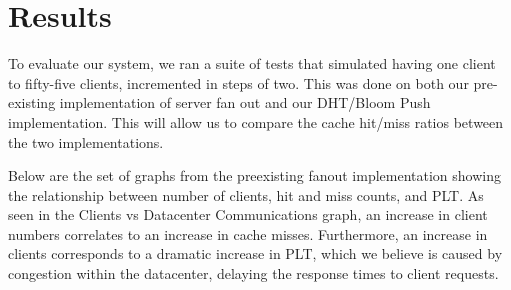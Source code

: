 \documentclass[conference]{IEEEtran}
\begin{document}
\section{Results}\label{sec:results}
To evaluate our system, we ran a suite of tests that simulated having one client to fifty-five clients, incremented in steps of two. This was done on both our pre-existing implementation of server fan out and our DHT/Bloom Push implementation.  This will allow us to compare the cache hit/miss ratios between the two implementations.

Below are the set of graphs from the preexisting fanout implementation showing the relationship between number of clients, hit and miss counts, and PLT. As seen in the Clients vs Datacenter Communications graph, an increase in client numbers correlates to an increase in cache misses. Furthermore, an increase in clients corresponds to a dramatic increase in PLT, which we believe is caused by congestion within the datacenter, delaying the response times to client requests. 
\end{document}

